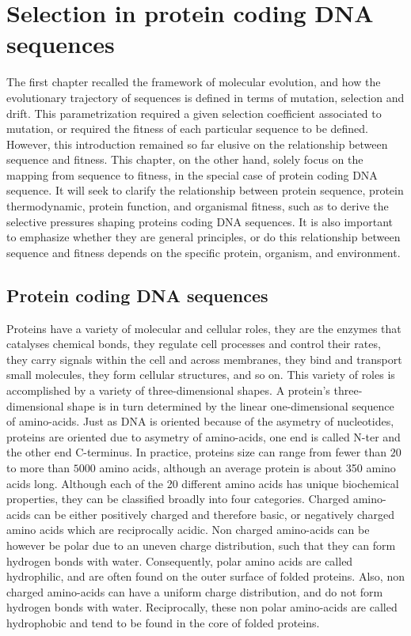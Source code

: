 \chapter{Selection in protein coding \acrshort{DNA} sequences}
\minitoc
\label{sec:selection}
The first chapter recalled the framework of molecular evolution, and how the evolutionary trajectory of sequences is defined in terms of mutation, selection and drift. 
This parametrization required a given selection coefficient associated to mutation, or required the fitness of each particular sequence to be defined.
However, this introduction remained so far elusive on the relationship between sequence and fitness.
This chapter, on the other hand, solely focus on the mapping from sequence to fitness, in the special case of protein coding \acrshort{DNA} sequence.
It will seek to clarify the relationship between protein sequence, protein thermodynamic, protein function, and organismal fitness, such as to derive the selective pressures shaping proteins coding \acrshort{DNA} sequences.
It is also important to emphasize whether they are general principles, or do this relationship between sequence and fitness depends on the specific protein, organism, and environment.

\section{Protein coding DNA sequences}

Proteins have a variety of molecular and cellular roles, they are the enzymes that catalyses chemical bonds, they regulate cell processes and control their rates, they carry signals within the cell and across membranes, they bind and transport small molecules, they form cellular structures, and so on.
This variety of roles is accomplished by a variety of three-dimensional shapes.
A protein's three-dimensional shape is in turn determined by the linear one-dimensional sequence of amino-acids.
Just as \acrshort{DNA} is oriented because of the asymetry of nucleotides, proteins are oriented due to asymetry of amino-acids, one end is called \gls{N-ter} and the other end C-terminus. 
In practice, proteins size can range from fewer than $20$ to more than $5000$ amino acids, although an average protein is about 350 amino acids long.
Although each of the 20 different amino acids has unique biochemical properties, they can be classified broadly into four categories.
Charged amino-acids can be either positively charged and therefore basic, or negatively charged amino acids which are reciprocally acidic.
Non charged amino-acids can be however be polar due to an uneven charge distribution, such that they can form hydrogen bonds with water.
Consequently, polar amino acids are called hydrophilic, and are often found on the outer surface of folded proteins.
Also, non charged amino-acids can have a uniform charge distribution, and do not form hydrogen bonds with water.
Reciprocally, these non polar amino-acids are called hydrophobic and tend to be found in the core of folded proteins.

